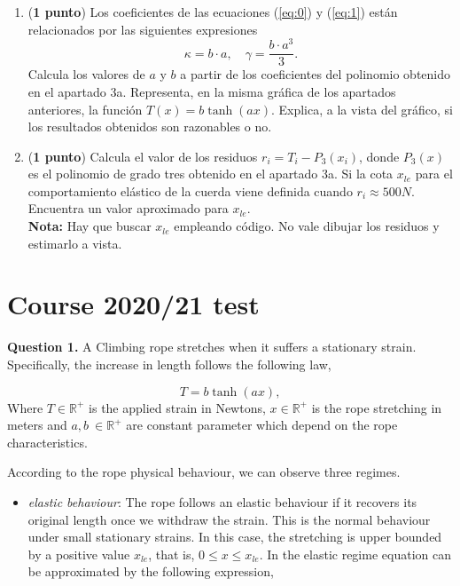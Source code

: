 \begin{paracol}{2}
\begin{enumerate}
\item (\textbf{1 punto})  Los coeficientes de las ecuaciones (\ref{eq:0}) y (\ref{eq:1}) están relacionados por las siguientes expresiones
\begin{equation}
\kappa = b\cdot a, \quad \gamma = \frac{b\cdot a^3}{3}. \nonumber
\end{equation}
		Calcula los valores de $a$ y $b$ a partir de los coeficientes del polinomio obtenido en el apartado 3a. Representa, en la misma gráfica de los apartados anteriores, la función $T(x) = b\tanh(ax)$. Explica, a la vista del gráfico, si los resultados obtenidos son razonables o no. 

\item (\textbf{1 punto}) Calcula el valor de los residuos $r_i = T_i - P_3(x_i)$, donde $P_3(x)$ es el polinomio de grado tres obtenido en el apartado 3a. Si la cota $x_{le}$ para el comportamiento elástico de la cuerda viene definida cuando $r_i \approx 500 N$. Encuentra un valor aproximado para $x_{le}$. \\
\textbf{Nota:} Hay que buscar $x_{le}$ empleando código. No vale dibujar los residuos y estimarlo a vista.
\end{enumerate}

\switchcolumn
\section{Course 2020/21 test}
\noindent \textbf{Question 1.} A Climbing rope stretches when it suffers a stationary strain. Specifically, the increase in length follows the following law,

\begin{equation}\label{eq:0}
	T = b\tanh(ax),
\end{equation}
Where $T \in \mathbb{R}^+$ is the applied strain in Newtons, $x \in \mathbb{R}^+$ is the rope stretching in meters and  $a, b \ \in \mathbb{R}^+$ are constant parameter which depend on the rope characteristics.

According to the rope physical behaviour, we can observe three regimes.

\begin{itemize}
	 \item \emph{elastic behaviour}: The rope follows an elastic behaviour if it recovers its original length once we withdraw the strain. This is the normal behaviour under small stationary strains. In this case, the stretching is upper bounded by a positive value $x_{le}$, that is, $0 \le x \le x_{le}$. In the elastic regime equation \label{eq:0} can be approximated by the following expression,
	

\end{itemize}
\end{paracol}
